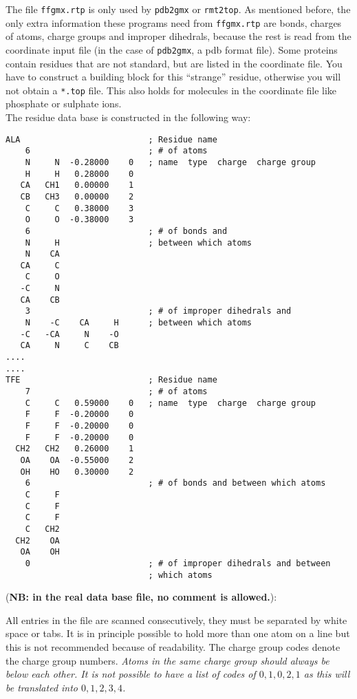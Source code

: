 The file {\tt ffgmx.rtp} is only used by \verb'pdb2gmx' or
\verb'rmt2top'. As mentioned before, the only extra information these
programs need from {\tt ffgmx.rtp} are bonds, charges of atoms,
charge groups and improper dihedrals, because the rest is read from
the coordinate input file (in the case of \verb'pdb2gmx', a pdb format
file). Some proteins contain residues that are not standard, but are
listed in the coordinate file. You have to construct a building block
for this ``strange'' residue, otherwise you will not obtain a
\verb'*.top' file. This also holds for molecules in the
coordinate file like phosphate or sulphate ions. \\
The residue data base is constructed in the following
way:
{\small
\begin{verbatim}
ALA                          ; Residue name
    6                        ; # of atoms
    N     N  -0.28000    0   ; name  type  charge  charge group
    H     H   0.28000    0
   CA   CH1   0.00000    1
   CB   CH3   0.00000    2
    C     C   0.38000    3
    O     O  -0.38000    3
    6                        ; # of bonds and 
    N     H                  ; between which atoms
    N    CA
   CA     C
    C     O
   -C     N
   CA    CB
    3                        ; # of improper dihedrals and
    N    -C    CA     H      ; between which atoms 
   -C   -CA     N    -O
   CA     N     C    CB
....
....
TFE                          ; Residue name  
    7                        ; # of atoms
    C     C   0.59000    0   ; name  type  charge  charge group
    F     F  -0.20000    0
    F     F  -0.20000    0
    F     F  -0.20000    0
  CH2   CH2   0.26000    1
   OA    OA  -0.55000    2
   OH    HO   0.30000    2
    6                        ; # of bonds and between which atoms
    C     F
    C     F
    C     F
    C   CH2
  CH2    OA
   OA    OH
    0                        ; # of improper dihedrals and between 
                             ; which atoms
\end{verbatim}}
({\bf NB: in the real data base file, no comment is allowed.}):

All entries in the file are scanned consecutively, they must be separated by
white space or tabs. It is in principle possible to hold more than one atom on
a line but this is not recommended because of readability. The charge group 
codes denote the charge group numbers. {\em Atoms in the same charge group
should always be below each other. It is not possible to have a 
list of codes of $0, 1, 0, 2, 1$ as this will be translated into
$0, 1, 2, 3, 4$.} 

